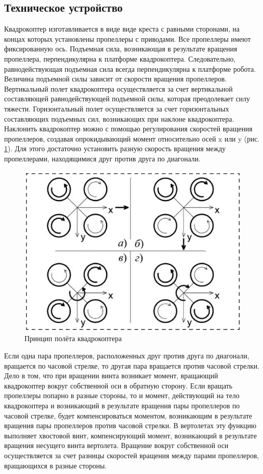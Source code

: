 \documentclass[a4paper, 14pt]{extarticle}
\let\Oldsubsection\subsection
\renewcommand{\subsection}{\FloatBarrier\Oldsubsection}
\begin{document}
\subsection{Техническое устройство}
Квадрокоптер изготавливается в виде
виде креста с равными сторонами, на концах которых установлены пропеллеры
с приводами. Все пропеллеры имеют фиксированную ось. Подъемная сила,
возникающая в результате вращения пропеллера, перпендикулярна к
платформе квадрокоптера. Следовательно, равнодействующая подъемная сила
всегда перпендикулярна к платформе робота. Величина подъемной силы
зависит от скорости вращения пропеллеров.
Вертикальный полет квадрокоптера осуществляется за счет вертикальной
составляющей равнодействующей подъемной силы, которая преодолевает силу
тяжести.
Горизонтальный полет осуществляется за счет горизонтальных
составляющих подъемных сил, возникающих при наклоне квадрокоптера.
Наклонить квадрокоптер можно с помощью регулирования скоростей вращения
пропеллеров, создавая опрокидывающий момент относительно осей x или y
(рис. \ref{fig:screenshot001}). Для этого достаточно установить разную скорость вращения между
пропеллерами, находящимися друг против друга по диагонали.
\begin{figure}[!htbp]
	\centering
	\includegraphics[width=0.7\linewidth]{others/screenshot001}
	\caption{Принцип полёта квадрокоптера}
	\label{fig:screenshot001}
\end{figure}
 
\par
Если одна пара пропеллеров, расположенных друг против друга по
диагонали, вращается по часовой стрелке, то другая пара вращается против
часовой стрелки. Дело в том, что при вращении винта возникает момент,
вращающий квадрокоптер вокруг собственной оси в обратную сторону. Если
вращать пропеллеры попарно в разные стороны, то и момент, действующий на
тело квадрокоптера и возникающий в результате вращения пары пропеллеров
по часовой стрелке, будет компенсироваться моментом, возникающим в
результате вращения пары пропеллеров против часовой стрелки. В вертолетах
эту функцию выполняет хвостовой винт, компенсирующий момент,
возникающий в результате вращения несущего винта вертолета. Вращение
вокруг собственной оси осуществляется за счет разницы скоростей вращения
между парами пропеллеров, вращающихся в разные стороны.
\end{document}
